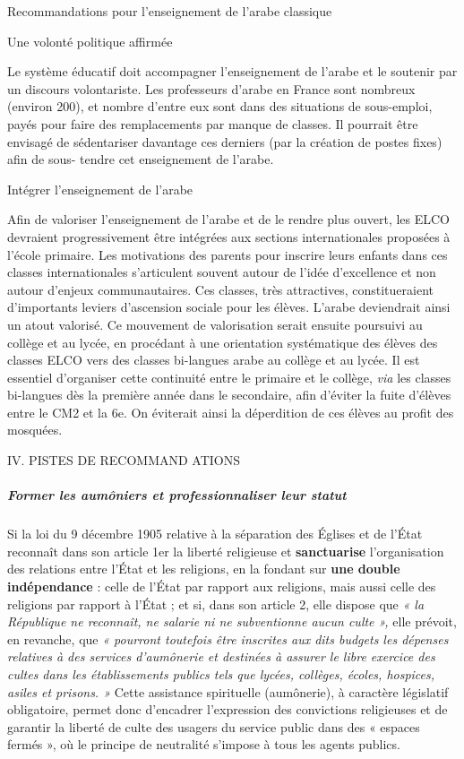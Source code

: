 Recommandations pour l'enseignement de l'arabe classique

Une volonté politique affirmée


Le système éducatif doit accompagner l'enseignement de l'arabe et le
soutenir par un discours volontariste. Les professeurs d'arabe en France
sont nombreux (environ 200), et nombre d'entre eux sont dans des
situations de sous-emploi, payés pour faire des remplacements par manque
de classes. Il pourrait être envisagé de sédentariser davantage ces
derniers (par la création de postes fixes) afin de sous- tendre cet
enseignement de l'arabe.


Intégrer l'enseignement de l'arabe


Afin de valoriser l'enseignement de l'arabe et de le rendre plus ouvert,
les ELCO devraient progressivement être intégrées aux sections
internationales proposées à l'école primaire. Les motivations des
parents pour inscrire leurs enfants dans ces classes internationales
s'articulent souvent autour de l'idée d'excellence et non autour
d'enjeux communautaires. Ces classes, très attractives, constitueraient
d'importants leviers d'ascension sociale pour les élèves. L'arabe
deviendrait ainsi un atout valorisé. Ce mouvement de valorisation serait
ensuite poursuivi au collège et au lycée, en procédant à une orientation
systématique des élèves des classes ELCO vers des classes bi-langues
arabe au collège et au lycée. Il est essentiel d'organiser cette
continuité entre le primaire et le collège, \emph{via} les classes
bi-langues dès la première année dans le secondaire, afin d'éviter la
fuite d'élèves entre le CM2 et la 6e. On éviterait ainsi la déperdition
de ces élèves au profit des mosquées.

IV. PISTES DE RECOMMAND ATIONS


\hypertarget{former-les-aumuxf4niers-et-professionnaliser-leur-statut}{%
\subparagraph{Former les aumôniers et professionnaliser leur
statut}\label{former-les-aumuxf4niers-et-professionnaliser-leur-statut}}


Si la loi du 9 décembre 1905 relative à la séparation des Églises et de
l'État reconnaît dans son article 1er la liberté religieuse et
\textbf{sanctuarise} l'organisation des relations entre l'État et les
religions, en la fondant sur \textbf{une double indépendance} : celle de
l'État par rapport aux religions, mais aussi celle des religions par
rapport à l'État ; et si, dans son article 2, elle dispose que \emph{«
la République ne reconnaît, ne salarie ni ne subventionne aucun culte
»,} elle prévoit, en revanche, que \emph{« pourront toutefois être
inscrites aux dits budgets les dépenses relatives à des services
d'aumônerie et destinées à assurer le libre exercice des cultes dans les
établissements publics tels que lycées, collèges, écoles, hospices,
asiles et prisons. »} Cette assistance spirituelle (aumônerie), à
caractère législatif obligatoire, permet donc d'encadrer l'expression
des convictions religieuses et de garantir la liberté de culte des
usagers du service public dans des « espaces fermés », où le principe de
neutralité s'impose à tous les agents publics.


